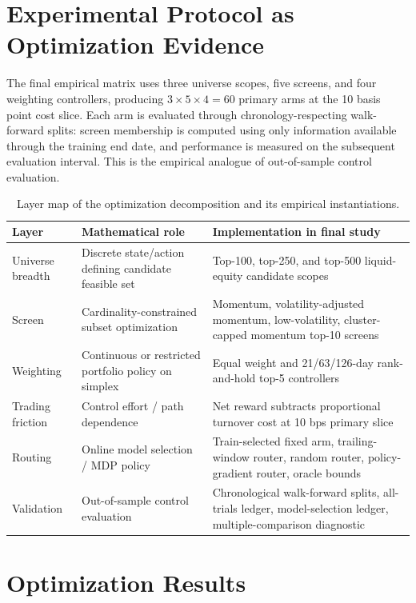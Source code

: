 \documentclass[11pt,a4paper]{article}
\begin{document}
\section{Experimental Protocol as Optimization Evidence}
The final empirical matrix uses three universe scopes, five screens, and four weighting controllers, producing $3\times5\times4=60$ primary arms at the 10 basis point cost slice. Each arm is evaluated through chronology-respecting walk-forward splits: screen membership is computed using only information available through the training end date, and performance is measured on the subsequent evaluation interval. This is the empirical analogue of out-of-sample control evaluation.

\begin{table}[H]
\centering
\caption{Layer map of the optimization decomposition and its empirical instantiations.}
\label{tab:layer_map}
\small
\begin{tabularx}{\textwidth}{p{2.6cm}p{3.8cm}X}
\toprule
Layer & Mathematical role & Implementation in final study\\
\midrule
Universe breadth & Discrete state/action defining candidate feasible set & Top-100, top-250, and top-500 liquid-equity candidate scopes\\
Screen & Cardinality-constrained subset optimization & Momentum, volatility-adjusted momentum, low-volatility, cluster-capped momentum top-10 screens\\
Weighting & Continuous or restricted portfolio policy on simplex & Equal weight and 21/63/126-day rank-and-hold top-5 controllers\\
Trading friction & Control effort / path dependence & Net reward subtracts proportional turnover cost at 10 bps primary slice\\
Routing & Online model selection / MDP policy & Train-selected fixed arm, trailing-window router, random router, policy-gradient router, oracle bounds\\
Validation & Out-of-sample control evaluation & Chronological walk-forward splits, all-trials ledger, model-selection ledger, multiple-comparison diagnostic\\
\bottomrule
\end{tabularx}
\end{table}

\section{Optimization Results}
\end{document}
